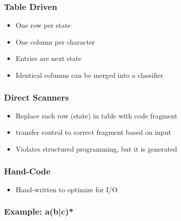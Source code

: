 \documentclass[usepdftitle=false,professionalfonts,compress ]{beamer}
\begin{document}
{
\begin{frame}\frametitle{Table Driven}

	\begin{itemize}
	\item One row per state
			\item One column per character
			\item Entries are next state
			\item Identical columns can be merged into a classifier
				\end{itemize}

\end{frame}}






{
\begin{frame}\frametitle{Direct Scanners}

	\begin{itemize}
	\item Replace each row (state) in table with code fragment
			\item transfer control to correct fragment based on input
			\item Violates structured programming, but it is generated
				\end{itemize}

\end{frame}}





{
\begin{frame}\frametitle{Hand-Code}

	\begin{itemize}
	\item Hand-written to optimize for I/O
				\end{itemize}

\end{frame}}



{
\begin{frame}\frametitle{Example: a(b|c)*}

\end{frame}}
\end{document}
